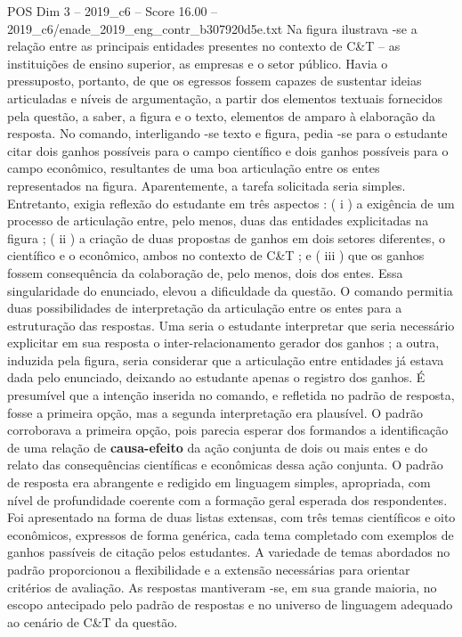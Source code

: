 \begin{textsample}{POS Dim 3 – 2019\_c6 – Score 16.00 – 2019\_c6/enade\_2019\_eng\_contr\_b307920d5e.txt}
Na figura ilustrava -se a relação entre as principais entidades presentes no contexto de C\&T – as instituições de ensino superior, as empresas e o setor público.
Havia o pressuposto, portanto, de que os egressos fossem capazes de sustentar ideias articuladas e níveis de argumentação, a partir dos elementos textuais fornecidos pela questão, a saber, a figura e o texto, elementos de amparo à elaboração da resposta.
No comando, interligando -se texto e figura, pedia -se para o estudante citar dois ganhos possíveis para o campo científico e dois ganhos possíveis para o campo econômico, resultantes de uma boa articulação entre os entes representados na figura.
Aparentemente, a tarefa solicitada seria simples.
Entretanto, exigia reflexão do estudante em três aspectos : ( i ) a exigência de um processo de articulação entre, pelo menos, duas das entidades explicitadas na figura ; ( ii ) a criação de duas propostas de ganhos em dois setores diferentes, o científico e o econômico, ambos no contexto de C\&T ; e ( iii ) que os ganhos fossem consequência da colaboração de, pelo menos, dois dos entes.
Essa singularidade do enunciado, elevou a dificuldade da questão.
O comando permitia duas possibilidades de interpretação da articulação entre os entes para a estruturação das respostas.
Uma seria o estudante interpretar que seria necessário explicitar em sua resposta o inter-relacionamento gerador dos ganhos ; a outra, induzida pela figura, seria considerar que a articulação entre entidades já estava dada pelo enunciado, deixando ao estudante apenas o registro dos ganhos.
É presumível que a intenção inserida no comando, e refletida no padrão de resposta, fosse a primeira opção, mas a segunda interpretação era plausível.
O padrão corroborava a primeira opção, pois parecia esperar dos formandos a identificação de uma relação de \textbf{causa-efeito} da ação conjunta de dois ou mais entes e do relato das consequências científicas e econômicas dessa ação conjunta.
O padrão de resposta era abrangente e redigido em linguagem simples, apropriada, com nível de profundidade coerente com a formação geral esperada dos respondentes.
Foi apresentado na forma de duas listas extensas, com três temas científicos e oito econômicos, expressos de forma genérica, cada tema completado com exemplos de ganhos passíveis de citação pelos estudantes.
A variedade de temas abordados no padrão proporcionou a flexibilidade e a extensão necessárias para orientar critérios de avaliação.
As respostas mantiveram -se, em sua grande maioria, no escopo antecipado pelo padrão de respostas e no universo de linguagem adequado ao cenário de C\&T da questão.

\end{textsample}
